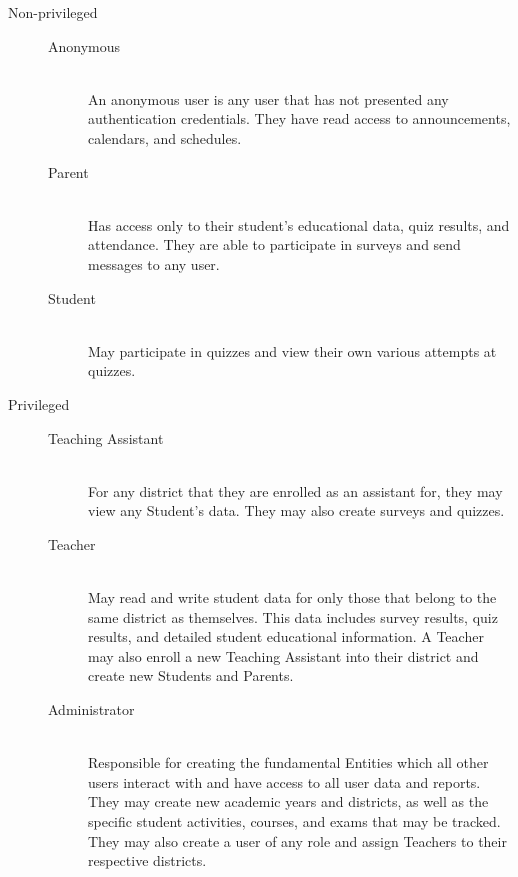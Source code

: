 \begin{description}
	\item [Non-privileged] \hfill
		\begin{description}
			\item [Anonymous] \hfill \\ An anonymous user is any user that has not presented any authentication credentials. They have read access to announcements, calendars, and schedules.
			\item [Parent] \hfill \\ Has access only to their student's educational data, quiz results, and attendance. They are able to participate in surveys and send messages to any user.
			\item [Student] \hfill \\ May participate in quizzes and view their own various attempts at quizzes.
		\end{description}
	\item [Privileged] \hfill
		\begin{description}
			\item [Teaching Assistant] \hfill \\ For any district that they are enrolled as an assistant for, they may view any Student's data. They may also create surveys and quizzes.
			\item [Teacher] \hfill \\ May read and write student data for only those that belong to the same district as themselves. This data includes survey results, quiz results, and detailed student educational information. A Teacher may also enroll a new Teaching Assistant into their district and  create new Students and Parents.
			\item [Administrator] \hfill \\ Responsible for creating the fundamental Entities which all other users interact with and have access to all user data and reports. They may create new academic years and districts, as well as the specific student activities, courses, and exams that may be tracked. They may also create a user of any role and assign Teachers to their respective districts.
		\end{description}
\end{description}
